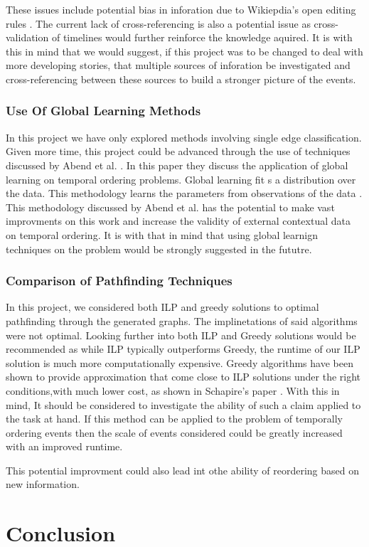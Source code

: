 \documentclass[bsc,frontabs,twoside,singlespacing,parskip,deptreport]{infthesis}     %
\begin{document}
These issues include potential bias in inforation due to Wikiepdia's open editing rules \cite{wikipediaeditrules}. The current lack of
cross-referencing is also a potential issue as cross-validation of timelines would further reinforce the knowledge aquired.
It is with this in mind that we would suggest, if this project was to be changed to deal with more developing stories, that
multiple sources of  inforation be investigated and cross-referencing between these sources to build a stronger picture of
the events.


\subsection{Use Of Global Learning Methods}
In this project we have only explored methods involving single edge classification. Given more time,
this project could be advanced through the use of techniques discussed by Abend et al. \cite{abend2015lexical}.
In this paper they discuss the application of global learning on temporal ordering problems. Global learning
fit s a distribution over the data. This methodology learns the parameters from observations of the data \cite{Huang2008}.
This methodology discussed by Abend et al. has the potential to make vast improvments on this work and increase the validity
of external contextual data on temporal ordering. It is with that in mind that using global learnign techniques on the problem
would be strongly suggested in the fututre.

\subsection{Comparison of Pathfinding Techniques}
In this project, we considered both ILP and greedy solutions to optimal pathfinding through the generated graphs.
The implinetations of said algorithms were not optimal. Looking further into both ILP and Greedy solutions would
be recommended as while ILP typically outperforms Greedy, the runtime of our ILP solution is much more computationally
expensive. Greedy algorithms have been shown to provide approximation that come close to ILP solutions under the right
conditions,with much lower cost, as shown in Schapire's paper \cite{schapire1998learning}. With this in mind,
It should be considered to investigate the ability of such a claim applied to the task at hand. If this method can
be applied to the problem of temporally ordering events then the scale of events considered could be greatly increased with
an improved runtime.

This potential improvment could also lead int othe ability of reordering based on new information.


\chapter{Conclusion}


\end{document}
